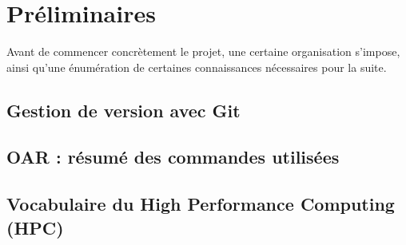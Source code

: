 
\section{Préliminaires}
\label{sec:preliminaires}

\par Avant de commencer concrètement le projet, une certaine organisation s'impose, ainsi qu'une énumération de certaines connaissances nécessaires pour la suite. 

\subsection{Gestion de version avec Git}
\label{sec:gestion-de-version}



\subsection{OAR : résumé des commandes utilisées}
\label{sec:oar-:-resume}



\subsection{Vocabulaire du High Performance Computing (HPC)}
\label{sec:vocab-spec-du}


